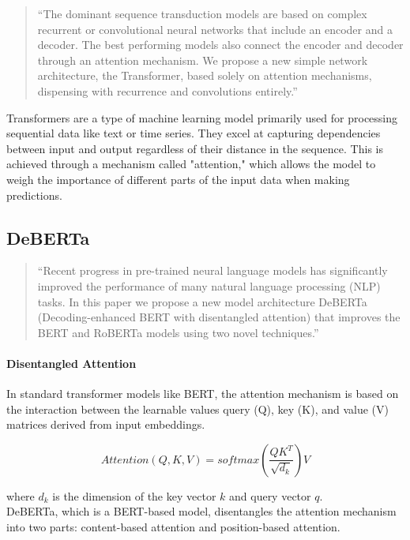 \begin{quote}
    ``The dominant sequence transduction models are based on complex recurrent or
    convolutional neural networks that include an encoder and a decoder. The best
    performing models also connect the encoder and decoder through an attention
    mechanism. We propose a new simple network architecture, the Transformer,
    based solely on attention mechanisms, dispensing with recurrence and convolutions
    entirely.'' \parencite{vaswani2023attention}
\end{quote}

Transformers are a type of machine learning model primarily used for processing sequential data like text or time series.
They excel at capturing dependencies between input and output regardless of their distance in the sequence.
This is achieved through a mechanism called "attention," which allows the model to weigh the importance of different parts of the input data when making predictions.


\subsection{DeBERTa}
\begin{quote}
``Recent progress in pre-trained neural language models has significantly improved
the performance of many natural language processing (NLP) tasks. In this paper we propose a new model architecture DeBERTa (Decoding-enhanced BERT
with disentangled attention) that improves the BERT and RoBERTa models using
two novel techniques.'' \parencite{he2021deberta}
\end{quote}

\paragraph{Disentangled Attention} In standard transformer models like BERT, the attention mechanism is based on the interaction between the learnable values query (Q), key (K), and value (V) matrices derived from input embeddings. 

\begin{equation}\label{eq:attention}
Attention(Q, K, V) = softmax(\frac{QK^T}{\sqrt{d_k}})V
\end{equation}

where $d_k$ is the dimension of the key vector $k$ and query vector $q$. \\
DeBERTa, which is a BERT-based model, disentangles the attention mechanism into two parts: content-based attention and position-based attention.

